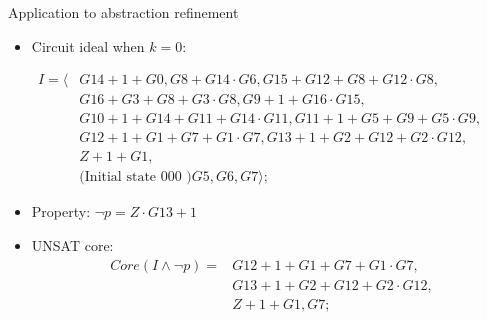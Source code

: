 \documentclass[xcolor=dvipsnames]{beamer}
\newcommand{\bi}{\begin{itemize}}
\newcommand{\ei}{\end{itemize}}
\begin{document}
\begin{frame}{\large{Application to abstraction refinement}}
\bi
\item Circuit ideal when $k=0$:
\ei
\begin{align*}
I = \langle & G14+1+G0, G8+G14\cdot G6, G15+G12+G8+G12\cdot G8,\\ 
	& G16+G3+G8+G3\cdot G8, G9+1+G16\cdot G15, \\ 
	& G10+1+G14+G11+G14\cdot G11, G11+1+G5+G9+G5\cdot G9, \\
	& G12+1+G1+G7+G1\cdot G7, G13+1+G2+G12+G2\cdot G12, \\
	& Z+1+G1, \\
	& \text{(Initial state 000 )} G5, G6, G7 \rangle;
\end{align*}
\vspace{-0.2in}
\bi
\item Property: $\neg p = Z\cdot G13 + 1$
\item UNSAT core: \begin{align*}
Core(I\land \neg p) =& G12+1+G1+G7+G1\cdot G7,\\
&G13+1+G2+G12+G2\cdot G12, \\
& Z+1+G1, G7;
\end{align*}
\ei
\end{frame}
\end{document}
